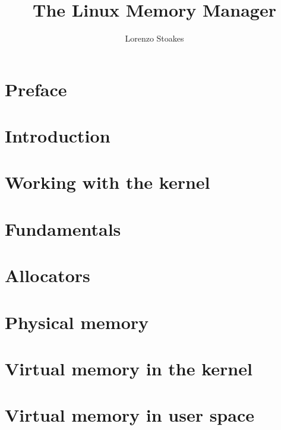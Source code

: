 \documentclass[a4paper,oneside]{scrbook}
\begin{document}
\title{The Linux Memory Manager}
\author{Lorenzo Stoakes}
\frontmatter
\date{} %
\maketitle
\tableofcontents
\chapter{Preface}



\mainmatter
\chapter{Introduction}



\chapter{Working with the kernel}



\chapter{Fundamentals}



\chapter{Allocators}



\chapter{Physical memory}



\chapter{Virtual memory in the kernel}



\chapter{Virtual memory in user space}
\end{document}
